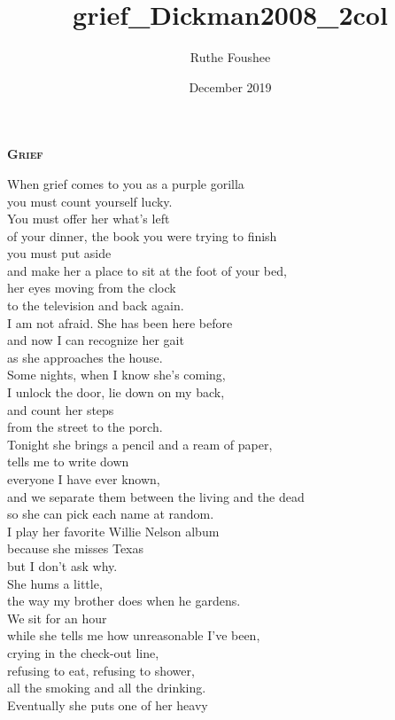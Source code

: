 \documentclass[10pt]{memoir}
\title{grief_Dickman2008_2col}
\author{Ruthe Foushee}
\date{December 2019}
\begin{document}
\begin{multicols}{2}
\thispagestyle{empty} %
\noindent \textbf{\textsc{\Large Grief}}
\vspace{18pt}

{
When grief comes to you as a purple gorilla\\
you must count yourself lucky.\\
You must offer her what's left\\
of your dinner, the book you were trying to finish\\
you must put aside\\
and make her a place to sit at the foot of your bed,\\
her eyes moving from the clock\\
to the television and back again.\\
I am not afraid. She has been here before\\
and now I can recognize her gait\\
as she approaches the house.\\
Some nights, when I know she's coming,\\
I unlock the door, lie down on my back,\\
and count her steps\\
from the street to the porch.\\
Tonight she brings a pencil and a ream of paper,\\
tells me to write down\\
everyone I have ever known,\\
and we separate them between the living and the dead\\
so she can pick each name at random.\\
I play her favorite Willie Nelson album\\
because she misses Texas\\
but I don't ask why.\\
She hums a little,\\
the way my brother does when he gardens.\\
We sit for an hour\\
while she tells me how unreasonable I've been,\\
crying in the check-out line,\\
refusing to eat, refusing to shower,\\
all the smoking and all the drinking.\\
Eventually she puts one of her heavy\\
}
\end{multicols}
\end{document}
